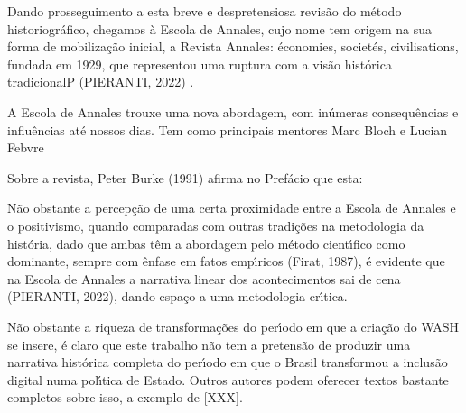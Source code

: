 \documentclass[
12pt,		%
openright,	%
twoside,  %
a4paper,			%
chapter=TITLE,		%
english,			%
french,				%
spanish,			%
brazil				%
]{USPSC-classe/USPSC}
\begin{document}
Dando prosseguimento a esta breve e despretensiosa revis\~ao do m\'etodo historiogr\'afico, chegamos \`a Escola de Annales, cujo nome tem origem na sua forma de mobiliza\c{c}\~ao inicial, a Revista Annales: \'economies, societ\'es, civilisations, fundada em 1929, que representou uma ruptura com a vis\~ao hist\'orica tradicionalP (PIERANTI, 2022) .


A Escola de Annales trouxe uma nova abordagem, com in\'umeras consequ\^encias e influ\^encias at\'e nossos dias. Tem como principais mentores  Marc Bloch e Lucian Febvre


Sobre a revista, Peter Burke (1991) afirma no Pref\'acio que esta:






\noindent\begin{center}\mbox{\centering{}}\end{center}


N\~ao obstante a percep\c{c}\~ao de uma certa proximidade entre a Escola de Annales e o positivismo, quando comparadas com outras tradi\c{c}\~oes na metodologia da hist\'oria, dado que ambas t\^em a abordagem pelo m\'etodo cient\'{\i}fico como dominante, sempre com \^enfase em fatos emp\'{\i}ricos (Firat, 1987), \'e evidente que na Escola de Annales a narrativa linear dos acontecimentos sai de cena (PIERANTI, 2022), dando espa\c{c}o a uma metodologia cr\'{\i}tica.


N\~ao obstante a riqueza de transforma\c{c}\~oes do per\'{\i}odo em que a cria\c{c}\~ao do WASH se insere, \'e claro que este trabalho n\~ao tem a pretens\~ao de produzir uma narrativa hist\'orica completa do per\'{\i}odo em que o Brasil transformou a inclus\~ao digital numa pol\'{\i}tica de Estado. Outros autores podem oferecer textos bastante completos sobre isso, a exemplo de [XXX].
\end{document}
